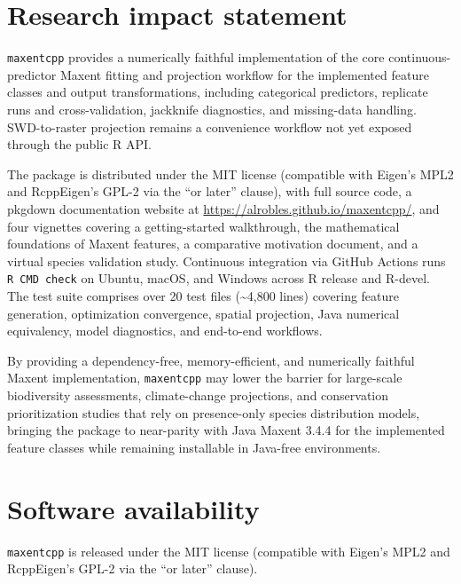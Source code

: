 \documentclass[10pt,letterpaper]{article}
\begin{document}
\section*{Research impact statement}

\texttt{maxentcpp} provides a numerically faithful implementation of the
core continuous-predictor Maxent fitting and projection workflow for the
implemented feature classes and output transformations, including
categorical predictors, replicate runs and cross-validation, jackknife
diagnostics, and missing-data handling. SWD-to-raster projection remains
a convenience workflow not yet exposed through the public R API.

The package is distributed under the MIT license (compatible with
Eigen's MPL2 and RcppEigen's GPL-2 via the ``or later'' clause), with
full source code, a pkgdown documentation website at
\url{https://alrobles.github.io/maxentcpp/}, and four vignettes covering
a getting-started walkthrough, the mathematical foundations of Maxent
features, a comparative motivation document, and a virtual species
validation study. Continuous integration via GitHub Actions runs
\texttt{R\ CMD\ check} on Ubuntu, macOS, and Windows across R release
and R-devel. The test suite comprises over 20 test files
(\textasciitilde4,800 lines) covering feature generation, optimization
convergence, spatial projection, Java numerical equivalency, model
diagnostics, and end-to-end workflows.

By providing a dependency-free, memory-efficient, and numerically
faithful Maxent implementation, \texttt{maxentcpp} may lower the barrier
for large-scale biodiversity assessments, climate-change projections,
and conservation prioritization studies that rely on presence-only
species distribution models, bringing the package to near-parity with
Java Maxent 3.4.4 for the implemented feature classes while remaining
installable in Java-free environments.

\section*{Software availability}

\texttt{maxentcpp} is released under the MIT license (compatible with
Eigen's MPL2 and RcppEigen's GPL-2 via the ``or later'' clause).
\end{document}
